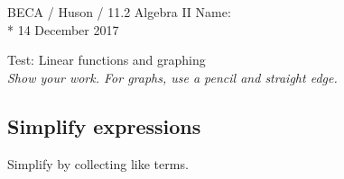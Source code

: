 \documentclass[]{book}
\begin{document}
\noindent BECA / Huson / 11.2 Algebra II \hspace{2in} Name:\\*
14 December 2017
\begin{center}
{\Large Test: Linear functions and graphing}\\
\textit{Show your work. For graphs, use a pencil and straight edge.}
\end{center}



\subsection*{Simplify expressions}

Simplify by collecting like terms.
\end{document}

